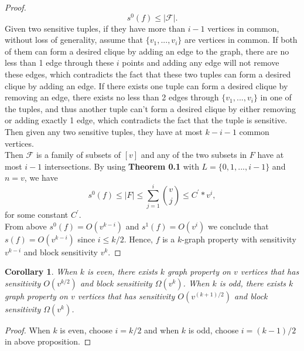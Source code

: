 \documentclass[psamsfonts]{amsart}
\newtheorem{cor}[thm]{Corollary}
\theoremstyle{definition}
\theoremstyle{remark}
\numberwithin{equation}{section}
\begin{document}
\begin{proof}
		\begin{equation}
			s^0(f) \leq |\mathcal{F}|.
		\end{equation}
		\indent Given two sensitive tuples, if they have more than $i-1$ vertices in common, without loss of generality, assume that $\{v_1,...,v_i\}$ are vertices in common. If both of them can form a desired clique by adding an edge to the graph, there are no less than 1 edge through these $i$ points and adding any edge will not remove these edges, which contradicts the fact that these two tuples can form a desired clique by adding an edge. If there exists one tuple can form a desired clique by removing an edge, there exists no less than 2 edges through $\{v_1,...,v_i\}$ in one of the tuples, and thus another tuple can't form a desired clique by either removing or adding exactly 1 edge, which contradicts the fact that the tuple is sensitive. Then given any two sensitive tuples, they have at most $k-i-1$ common vertices.\\
		\indent Then $\mathcal{F}$ is a family of subsets of $[v]$ and any of the two subsets in $F$ have at most $i-1$ intersections. By using \textbf{Theorem 0.1} with $L=\{0,1,...,i-1\}$ and $n=v$, we have
		\begin{equation}
			s^0(f) \leq |F| \leq \sum_{j=1}^{i} {v \choose{j}} \leq C^\prime * v^{i},
		\end{equation}
		for some constant $C^\prime$.\\
		\indent From above $s^0(f) = O(v^{k-i})$ and $s^1(f) = O(v^{i})$ we conclude that $s(f) = O(v^{k-i})$ since $i \leq k/2$. Hence, $f$ is a $k$-graph property with sensitivity $v^{k-i}$ and block sensitivity $v^{k}$.
	\end{proof}
	
	\begin{cor}
		When $k$ is even, there exists $k$ graph property on $v$ vertices that has sensitivity $O(v^{k/2})$ and block sensitivity $\Omega (v^k)$. When $k$ is odd, there exists $k$ graph property on $v$ vertices that has sensitivity $O(v^{(k+1)/2})$ and block sensitivity $\Omega (v^k)$.
	\end{cor}
	\begin{proof}
		When $k$ is even, choose $i=k/2$ and when $k$ is odd, choose $i=(k-1)/2$ in above proposition.
	\end{proof}
\end{document}
